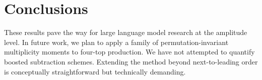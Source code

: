 \section{Conclusions}\label{sec:conclusions}

These results pave the way for large language model research at the
amplitude level. In future work, we plan to apply a family of
permutation-invariant multiplicity moments to four-top production. We
have not attempted to quantify boosted subtraction schemes. Extending
the method beyond next-to-leading order is conceptually straightforward
but technically demanding.

